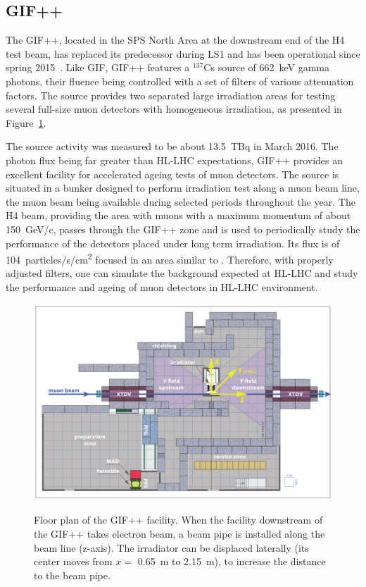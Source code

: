 		\subsection{GIF++}
		\label{chapt5:ssec:GIF++}
		
	The \acf{GIF++}, located in the SPS North Area at the downstream end of the H4 test beam, has replaced its predecessor during LS1 and has been operational since spring 2015~\cite{JAKEL2014}. Like GIF, GIF++ features a $^{137}$Cs source of \SI{662}{keV} gamma photons, their fluence being controlled with a set of filters of various attenuation factors. The source provides two separated large irradiation areas for testing several full-size muon detectors with homogeneous irradiation, as presented in Figure~\ref{fig:GIFpp-Layout}.
	
	 The source activity was measured to be about \SI{13.5}{TBq} in March 2016. The photon flux being far greater than HL-LHC expectations, GIF++ provides an excellent facility for accelerated ageing tests of muon detectors. The source is situated in a bunker designed to perform irradiation test along a muon beam line, the muon beam being available during selected periods throughout the year. The H4 beam, providing the area with muons with a maximum momentum of about \SI{150}{GeV/c}, passes through the GIF++ zone and is used to periodically study the performance of the detectors placed under long term irradiation. Its flux is of \SI{104}{particles/s/\square\cm} focused in an area similar to . Therefore, with properly adjusted filters, one can simulate the background expected at HL-LHC and study the performance and ageing of muon detectors in HL-LHC environment.\\
	
	\begin{figure}[H]
		\centering
		\includegraphics[width = 0.8\plotwidth]{fig/chapt5/GIFpp-Layout.png}\\
		\caption{\label{fig:GIFpp-Layout} Floor plan of the GIF++ facility. When the facility downstream of the GIF++ takes electron beam, a beam pipe is installed along the beam line (z-axis). The irradiator can be displaced laterally (its center moves from $x=$ \SI{0.65}{m} to \SI{2.15}{m}), to increase the distance to the beam pipe.}
	\end{figure}
	 
